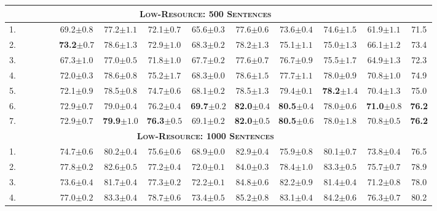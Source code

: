 \documentclass[11pt,a4paper]{article}
\newcommand{\cmark}{\textcolor{blue}{\ding{51}}}
\newcommand{\xmark}{\textcolor{red}{\ding{55}}}
\begin{document}
\begin{table*}[t]
\begin{tabular}{l|cccc||cccccccc|c}
\hline\hline
\multicolumn{13}{c}{\bf \textsc{Low-Resource: 500 Sentences}}\\
\hline
1. & \xmark & \cmark & \xmark & \xmark & 69.2$\pm0.8$ & 77.2$\pm1.1$ & 72.1$\pm0.7$ & 65.6$\pm0.3$ & 77.6$\pm0.6$ & 73.6$\pm0.4$ & 74.6$\pm1.5$ & 61.9$\pm1.1$ & 71.5 \\
2. & \xmark & \cmark & \cmark & \xmark & \textbf{73.2}$\pm0.7$ & 78.6$\pm1.3$ & 72.9$\pm1.0$ & 68.3$\pm0.2$ & 78.2$\pm1.3$ & 75.1$\pm1.1$ & 75.0$\pm1.3$ & 66.1$\pm1.2$ & 73.4 \\
3. & \cmark & \xmark & \xmark & \xmark & 67.3$\pm1.0$ & 77.0$\pm0.5$ & 71.8$\pm1.0$ & 67.7$\pm0.2$ & 77.6$\pm0.7$ & 76.7$\pm0.9$ & 75.5$\pm1.7$ & 64.9$\pm1.3$ & 72.3 \\
4. & \cmark & \xmark & \cmark & \xmark & 72.0$\pm0.3$ & 78.6$\pm0.8$ & 75.2$\pm1.7$ & 68.3$\pm0.0$ & 78.6$\pm1.5$ & 77.7$\pm1.1$ & 78.0$\pm0.9$ & 70.8$\pm1.0$ & 74.9 \\
5. & \cmark & \xmark & \cmark & \cmark & 72.1$\pm0.9$ & 78.5$\pm0.8$ & 74.7$\pm0.6$ & 68.1$\pm0.2$ & 78.5$\pm1.3$ & 79.4$\pm0.1$ & \textbf{78.2}$\pm1.4$ & 70.4$\pm1.3$ & 75.0 \\
6. & \cmark & \cmark & \cmark & \xmark & 72.9$\pm0.7$ & 79.0$\pm0.4$ & 76.2$\pm0.4$ & \textbf{69.7}$\pm0.2$ & \textbf{82.0}$\pm0.4$ & \textbf{80.5}$\pm0.4$ & 78.0$\pm0.6$ & \textbf{71.0}$\pm0.8$ & \textbf{76.2} \\
7. & \cmark & \cmark & \cmark & \cmark & 72.9$\pm0.7$ & \textbf{79.9}$\pm1.0$ & \textbf{76.3}$\pm0.5$ & 69.1$\pm0.2$ & \textbf{82.0}$\pm0.5$ & \textbf{80.5}$\pm0.6$ & 78.0$\pm1.8$ & 70.8$\pm0.5$ & \textbf{76.2} \\
\hline\hline
\multicolumn{13}{c}{\bf \textsc{Low-Resource: 1000 Sentences}}\\
\hline
1. & \xmark & \cmark & \xmark & \xmark & 74.7$\pm0.6$ & 80.2$\pm0.4$ & 75.6$\pm0.6$ & 68.9$\pm0.0$ & 82.9$\pm0.4$ & 75.9$\pm0.8$ & 80.1$\pm0.7$ & 73.8$\pm0.4$ & 76.5 \\
2. & \xmark & \cmark & \cmark & \xmark & 77.8$\pm0.2$ & 82.6$\pm0.5$ & 77.2$\pm0.4$ & 72.0$\pm0.1$ & 84.0$\pm0.3$ & 78.4$\pm1.0$ & 83.3$\pm0.5$ & 75.7$\pm0.7$ & 78.9 \\
3. & \cmark & \xmark & \xmark & \xmark & 73.6$\pm0.4$ & 81.7$\pm0.4$ & 77.3$\pm0.2$ & 72.2$\pm0.1$ & 84.8$\pm0.6$ & 82.2$\pm0.9$ & 81.4$\pm0.4$ & 71.2$\pm0.8$ & 78.0 \\
4. & \cmark & \xmark & \cmark & \xmark & 77.0$\pm0.2$ & 83.3$\pm0.4$ & 78.7$\pm0.6$ & 73.4$\pm0.5$ & 85.2$\pm0.8$ & 83.1$\pm0.4$ & 84.2$\pm0.6$ & 76.3$\pm0.7$ & 80.2 \\

\end{tabular}
\end{table*}
\end{document}

